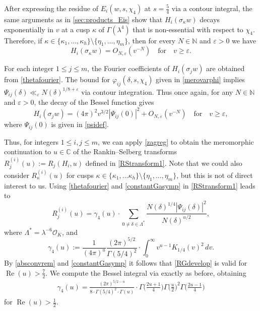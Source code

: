 \documentclass[12pt,reqno]{amsart}
\numberwithin{equation}{section}
\renewcommand{\Re}{\operatorname{Re}}
\newcommand{\C}{\mathbb{C}}
\newcommand{\N}{\mathbb{N}}
\begin{document}
After expressing the residue of $E_{i}(w,s,\chi_4)$ at $s = \frac{5}{4}$ via a contour integral, the same arguments as in \cref{sec:products_Eis} show that $H_i(\sigma_\kappa w)$ decays exponentially in $v$ at a cusp $\kappa$ of $\Gamma(\lambda^4)$ that is non-essential with respect to $\chi_4$. Therefore, if $\kappa \in \{\kappa_1,\ldots,\kappa_h\} \setminus \{\eta_1,\ldots,\eta_m\}$, then for every $N \in \N$ and $\varepsilon > 0$ we have
\begin{equation}\label{eq:non_ess_theta_RS_decay}
    H_i(\sigma_\kappa w) = O_{N, \varepsilon}(v^{-N}) \quad \text{for} \quad v \geq \varepsilon.
\end{equation}

For each integer $1\leq j\leq m$, the Fourier coefficients of $H_i(\sigma_j w)$ are obtained from \eqref{thetafourier}. The bound for $\varphi_{ij}(\delta, s, \chi_4)$ given in \cref{merovarphi} implies $\Psi_{ij}(\delta) \ll_\varepsilon N(\delta)^{1/8+\varepsilon}$ via contour integration. Thus once again, for any $N \in \N$ and $\varepsilon>0$, the decay of the Bessel function gives 
\begin{equation} \label{constantGasymp}
    H_i(\sigma_j w) = (4\pi)^2 v^{3/2} |\Psi_{i j}(0)|^2 + O_{N, \varepsilon}(v^{-N}) \quad \text{for} \quad v \geq \varepsilon,
\end{equation}
where $\Psi_{i j}(0)$ is given in \eqref{psidef}. 

Thus, for integers $1 \leq i,j \leq m$, we can apply \cref{zagreg} to obtain the meromorphic continuation to $u \in \C$ of the Rankin--Selberg transforms $R_j^{(i)}(u) := R_{j}(H_{i},u)$ defined in \eqref{RStransform1}. Note that we could also consider $R_{\kappa}^{(i)}(u)$ for cusps $\kappa \in \{\kappa_1,\ldots \kappa_h\} \setminus \{\eta_1,\ldots,\eta_m \}$, but this is not of direct interest to us. Using \eqref{thetafourier} and \eqref{constantGasymp} in \eqref{RStransform1} leads to 
\begin{equation} \label{RGdevelop}
    R_j^{(i)}(u) = \gamma_4(u) \cdot \sum_{0 \neq \delta \in \Lambda^{*}} \frac{N(\delta)^{1/4} |\Psi_{i j}(\delta)|^2}{N(\delta)^{u/2}},
\end{equation}
where $\Lambda^{*} = \lambda^{-6}\mathcal{O}_K$, and
\begin{equation} \label{gammadef}
    \gamma_4(u) :=\frac{1}{(4 \pi)^u} \frac{(2 \pi)^{5/2}}{\Gamma(5/4)^2} \cdot \int_0^{\infty} v^{u-1} K_{1/4}(v)^2 \, dv.
\end{equation}
By \cref{absconvrem} and \eqref{constantGasymp} it follows that \eqref{RGdevelop} is valid for $\Re(u)> \frac{7}{2}$.
We compute the Bessel integral via \cite[(6.576.4)]{GR} exactly as before, obtaining
\begin{align} \label{gammaeval}
    \gamma_4(u)= \frac{(2\pi)^{5/2-u} }{8\cdot \Gamma(5/4)^{2} \cdot \Gamma(u)} \cdot \Gamma \Big( \frac{2u+1}{4} \Big) \Gamma \Big( \frac{u}{2} \Big)^2 \Gamma \Big( \frac{2u-1}{4} \Big)
\end{align}
for $\Re(u)> \frac{1}{2}$. 
\end{document}
